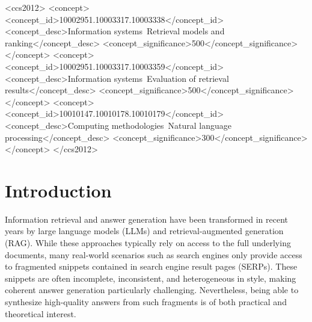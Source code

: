 \documentclass[manuscript,screen]{acmart}
\begin{document}
\begin{CCSXML}
\begin{CCSXML}
<ccs2012>
   <concept>
       <concept_id>10002951.10003317.10003338</concept_id>
       <concept_desc>Information systems~Retrieval models and ranking</concept_desc>
       <concept_significance>500</concept_significance>
       </concept>
   <concept>
       <concept_id>10002951.10003317.10003359</concept_id>
       <concept_desc>Information systems~Evaluation of retrieval results</concept_desc>
       <concept_significance>500</concept_significance>
       </concept>
   <concept>
       <concept_id>10010147.10010178.10010179</concept_id>
       <concept_desc>Computing methodologies~Natural language processing</concept_desc>
       <concept_significance>300</concept_significance>
       </concept>
 </ccs2012>
\end{CCSXML}




\maketitle

\section{Introduction}

Information retrieval and answer generation have been transformed in recent years by large language models (LLMs) and retrieval-augmented generation (RAG). While these approaches typically rely on access to the full underlying documents, many real-world scenarios such as search engines only provide access to fragmented snippets contained in search engine result pages (SERPs). These snippets are often incomplete, inconsistent, and heterogeneous in style, making coherent answer generation particularly challenging. Nevertheless, being able to synthesize high-quality answers from such fragments is of both practical and theoretical interest.


\end{CCSXML}
\end{document}
